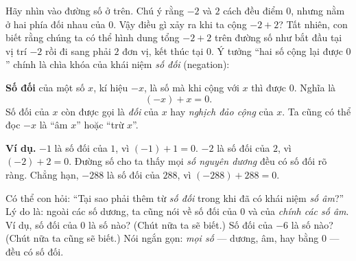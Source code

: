 Hãy nhìn vào đường số ở trên. Chú ý rằng $-2$ và $2$ cách đều điểm $0$,
nhưng nằm ở hai phía đối nhau của $0$. Vậy điều gì xảy ra khi ta cộng
$-2+2$? Tất nhiên, con biết rằng chúng ta có thể hình dung tổng \(-2+2\) trên đường số như bắt đầu tại vị trí
\(-2\) rồi đi sang phải \(2\) đơn vị, kết thúc tại \(0\).
Ý tưởng “hai số cộng lại được \(0\)” chính là chìa khóa của khái niệm
\emph{số đối} (negation):

\begin{tcolorbox}[colback=yellow!10, colframe=orange!80!black,
title={Định nghĩa: Số đối của một số}]
\textbf{Số đối} của một số \(x\), kí hiệu \(-x\), là số mà khi cộng với
\(x\) thì được \(0\). Nghĩa là
\[
(-x)+x=0.
\]
Số đối của \(x\) còn được gọi là \emph{đối} của \(x\) hay \emph{nghịch
đảo cộng} của \(x\). Ta cũng có thể đọc \(-x\) là “âm \(x\)” hoặc “trừ \(x\)”.
\end{tcolorbox}

\noindent\textbf{Ví dụ.}
\(-1\) là số đối của \(1\), vì \((-1)+1=0\).
\(-2\) là số đối của \(2\), vì \((-2)+2=0\).
Đường số cho ta thấy mọi \emph{số nguyên dương} đều có số đối rõ ràng.
Chẳng hạn, \(-288\) là số đối của \(288\), vì \((-288)+288=0\).

Có thể con hỏi: “Tại sao phải thêm từ \emph{số đối} trong khi đã có
khái niệm \emph{số âm}?” Lý do là: ngoài các số dương, ta cũng nói về
số đối của \(0\) và của \emph{chính các số âm}. Ví dụ, số đối của
\(0\) là số nào? (Chút nữa ta sẽ biết.) Số đối của \(-6\) là số nào?
(Chút nữa ta cũng sẽ biết.) Nói ngắn gọn: \emph{mọi số} — dương, âm, hay
bằng \(0\) — đều có số đối.

